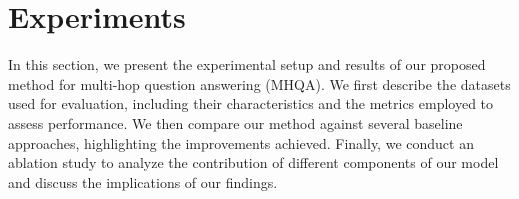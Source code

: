 \section{Experiments}
\label{experiments}
In this section, we present the experimental setup and results of our proposed method for multi-hop question answering (MHQA). We first describe the datasets used for evaluation, including their characteristics and the metrics employed to assess performance. We then compare our method against several baseline approaches, highlighting the improvements achieved. Finally, we conduct an ablation study to analyze the contribution of different components of our model and discuss the implications of our findings.